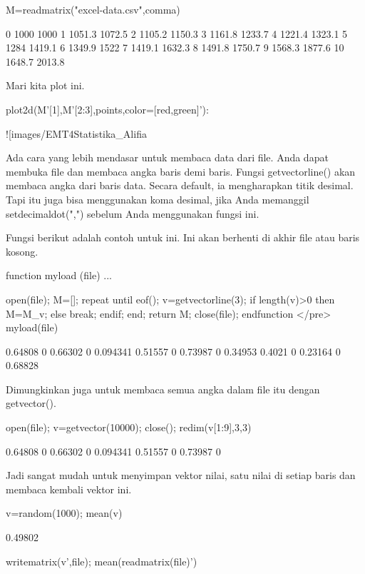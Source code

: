 \documentclass{article}
\begin{document}
\>M=readmatrix("excel-data.csv",\>comma)


            0      1000      1000 
            1    1051.3    1072.5 
            2    1105.2    1150.3 
            3    1161.8    1233.7 
            4    1221.4    1323.1 
            5      1284    1419.1 
            6    1349.9      1522 
            7    1419.1    1632.3 
            8    1491.8    1750.7 
            9    1568.3    1877.6 
           10    1648.7    2013.8 

Mari kita plot ini.


\>plot2d(M'[1],M'[2:3],\>points,color=[red,green]'):


![images/EMT4Statistika_Alifia%

Ada cara yang lebih mendasar untuk membaca data dari file. Anda dapat
membuka file dan membaca angka baris demi baris. Fungsi
getvectorline() akan membaca angka dari baris data. Secara default, ia
mengharapkan titik desimal. Tapi itu juga bisa menggunakan koma
desimal, jika Anda memanggil setdecimaldot(",") sebelum Anda
menggunakan fungsi ini.


Fungsi berikut adalah contoh untuk ini. Ini akan berhenti di akhir
file atau baris kosong.


\>function myload (file) ...


    open(file);
    M=[];
    repeat
       until eof();
       v=getvectorline(3);
       if length(v)>0 then M=M_v; else break; endif;
    end;
    return M;
    close(file);
    endfunction
</pre>
\>myload(file)


      0.64808         0   0.66302         0  0.094341 
      0.51557         0   0.73987         0   0.34953 
       0.4021         0   0.23164         0   0.68828 

Dimungkinkan juga untuk membaca semua angka dalam file itu dengan
getvector().


\>open(file); v=getvector(10000); close(); redim(v[1:9],3,3)


      0.64808         0   0.66302 
            0  0.094341   0.51557 
            0   0.73987         0 

Jadi sangat mudah untuk menyimpan vektor nilai, satu nilai di setiap
baris dan membaca kembali vektor ini.


\>v=random(1000); mean(v)


    0.49802

\>writematrix(v',file); mean(readmatrix(file)')
\end{document}
